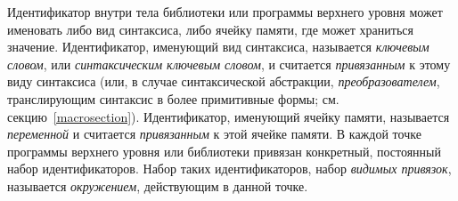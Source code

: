 Идентификатор внутри тела библиотеки или программы верхнего уровня может именовать
либо вид синтаксиса, либо ячейку памяти, где может храниться
значение. Идентификатор, именующий вид синтаксиса, называется {\em ключевым
  словом}, или {\em синтаксическим ключевым словом}, и считается {\em привязанным} к этому виду синтаксиса (или, в случае
синтаксической абстракции, {\em преобразователем}, транслирующим синтаксис в более
примитивные формы; см. секцию~\ref{macrosection}). Идентификатор, именующий ячейку памяти,
называется {\em переменной} и считается {\em привязанным} к этой
ячейке памяти. В каждой точке программы верхнего уровня или библиотеки привязан конкретный,
постоянный набор идентификаторов. Набор таких идентификаторов, набор
\textit{видимых привязок}, называется {\em окружением}, действующим в
данной точке.

